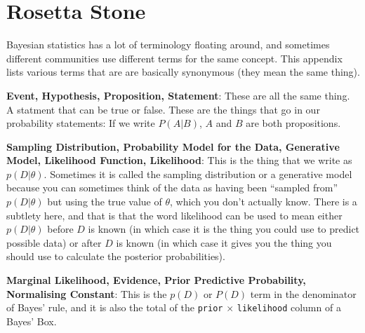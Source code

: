 \chapter{Rosetta Stone}
Bayesian statistics has a lot of terminology floating around, and sometimes
different communities use different terms for the same concept. This appendix
lists various terms that are are basically synonymous (they mean the same thing).

{\bf Event, Hypothesis, Proposition, Statement}: These are all the same thing.
A statment that can be true or false. These are the things that go in our
probability statements: If we write $P(A|B)$, $A$ and $B$ are both propositions.

{\bf Sampling Distribution, Probability Model for the Data, 
Generative Model, Likelihood Function, Likelihood}: This is the thing that we
write as $p(D|\theta)$. Sometimes it is called the sampling distribution or
a generative model because
you can sometimes think of the data as having been ``sampled from''
$p(D|\theta)$ but using the true value of $\theta$, which you don't actually
know. There is a subtlety here, and that is that the word likelihood can be
used to mean either $p(D|\theta)$ before $D$ is known (in which case it is the
thing you could use to predict possible data) or after $D$ is known (in which
case it gives you the thing you should use to calculate the posterior
probabilities).

{\bf Marginal Likelihood, Evidence, Prior Predictive Probability, Normalising
Constant}: This is the $p(D)$ or $P(D)$ term in the denominator of Bayes' rule,
and it is also the total of the {\tt prior} $\times$ {\tt likelihood} column
of a Bayes' Box.

